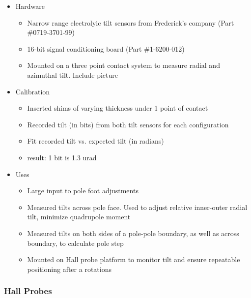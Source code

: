 \begin{itemize}
    \item Hardware
        \begin{itemize}
            \item Narrow range electrolyic tilt sensors from Frederick's company (Part \#0719-3701-99)
            \item 16-bit signal conditioning board (Part \#1-6200-012)
            \item Mounted on a three point contact system to measure radial and azimuthal tilt. Include picture
        \end{itemize}
    \item Calibration
        \begin{itemize}
            \item Inserted shims of varying thickness under 1 point of contact
            \item Recorded tilt (in bits) from both tilt sensors for each configuration
            \item Fit recorded tilt vs. expected tilt (in radians)
            \item result: 1 bit is 1.3 urad
        \end{itemize}
    \item Uses
        \begin{itemize}
            \item Large input to pole foot adjustments
            \item Measured tilts across pole face. Used to adjust relative inner-outer radial tilt, minimize quadrupole moment
            \item Measured tilts on both sides of a pole-pole boundary, as well as across boundary, to calculate pole step
            \item Mounted on Hall probe platform to monitor tilt and ensure repeatable positioning after a rotations
        \end{itemize}
\end{itemize}

\subsubsection{Hall Probes}

